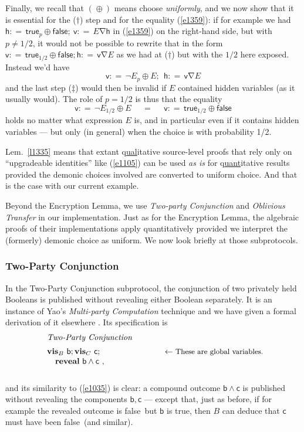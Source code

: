 \documentclass[runningheads]{llncs}
\makeatletter
\newcommand\Vh {\mathsf{h}}
\newcommand\Vv {\mathsf{v}}
\newcommand\Vb {\mathsf{b}}
\newcommand\Vc {\mathsf{c}}
\newcommand\Eqn[1] {(\ref{#1})}
\newcommand\Gets {{:}{=}\,}
\newcommand\Reveal {\textbf{reveal}}
\newcommand\PC[1] {\mathbin{_{#1}\oplus}} \newcommand\UC[1] {\mathbin{_{#1}\uplus}} \newcommand{\ITE}[3]{#1\,\IF\,#2\,\ELSE\,#3}
\newcommand\True {\textsf{true}}
\newcommand\False {\textsf{false}}
\newcommand\Xor {\mathbin{\nabla}}
\newcommand\Vis {\textbf{vis}}
\newcommand\IF {\textbf{if}}
\newcommand\ELSE {\textbf{else}}
\newcommand\WIDE[1] {~~~~~~#1~~~~~~}
\newenvironment{NumMini}[1]{\begin{equation}\label{#1}\begin{minipage}{.8\linewidth}}{\end{minipage}\end{equation}}
\newenvironment{Reason}{\vspace{-.0em}\begin{tabbing}\hspace{2em}\= \hspace{1cm} \= \kill}{\end{tabbing}\vspace{-1em}}
\newcommand\Step[2] {#1 \> $\begin{array}[t]{@{}llll}#2\end{array}$ \\}
\newcommand\Lem[1] {Lem.~\ref{#1}}
\makeatother
\begin{document}
Finally, we recall that $(\PC{})$ means choose \emph{uniformly}, and we now show that it is essential for the ($\dag$) step and for the equality \Eqn{e1359}: if for example we had $\Vh\Gets\True\PC{p}\False;~\Vv\Gets E{\Xor}\Vh$ in \Eqn{e1359} on the right-hand side, but with $p{\neq}1/2$, it would not be possible to rewrite that in the form $\Vv\Gets\True\PC{1/2}\False; \Vh\Gets \Vv{\Xor}E$ as we had at ($\dagger$) but with the $1/2$ here exposed. Instead we'd have
\[
 \Vv\Gets\neg E{\PC{p}}E;~~\Vh\Gets \Vv{\Xor}E
\]
and the last step ($\ddagger$) would then be invalid if $E$ contained hidden variables (as it usually would). The role of $p{=}1/2$ is thus that the equality
\[
 \Vv\Gets\neg E\PC{1/2}E \WIDE{=} \Vv\Gets\True\PC{1/2}\False
\]
holds no matter what expression $E$ is, and in particular even if it contains hidden variables --- but only (in general) when the choice is with probability 1/2.


\Lem{l1335} means that extant q\underline{ual}itative source-level proofs that rely only on ``upgradeable identities'' like \Eqn{e1105} can be used \emph{as is} for q\underline{uant}itative results provided the demonic choices involved are converted to uniform choice. And that is the case with our current example.

Beyond the Encryption Lemma, we use \emph{Two-party Conjunction} \cite{Yao:82} and \emph{Oblivious Transfer} \cite{Rivest:99} in our implementation.
Just as for the Encryption Lemma, the algebraic proofs of their implementations \cite{Morgan:07,McIver:09b} apply quantitatively provided we interpret the (formerly) demonic choice as uniform. We now look briefly at those subprotocols.

\subsubsection{Two-Party Conjunction} \label{s1223}
In the Two-Party Conjunction subprotocol,  the conjunction of two privately held Booleans is published without revealing either Boolean separately. It is an instance of Yao's \emph{Multi-party Computation} technique \cite{Yao:82} and we have given a formal derivation of it elsewhere \cite{McIver:09b}. Its specification is
\begin{NumMini}{e1058}\begin{Reason}
\Step{}{
 \hspace{-1em}\textit{Two-Party Conjunction} \\[0.5em]
 \hspace{-1em}\Vis_{B}~\Vb; \Vis_{C}~\Vc;
  & \hspace{3em}\textrm{$\leftarrow$\small\ These are global variables.} \\
 \Reveal~\Vb\land \Vc~,
}
\end{Reason}\end{NumMini}and its similarity to \Eqn{e1035} is clear: a compound outcome $\Vb\land \Vc$ is published without revealing the components $\Vb,\Vc$ --- except that, just as before, if for example the revealed outcome is \False\ but $\Vb$ is \True, then $B$ can deduce that $\Vc$ must have been \False\ (and similar).
\end{document}
